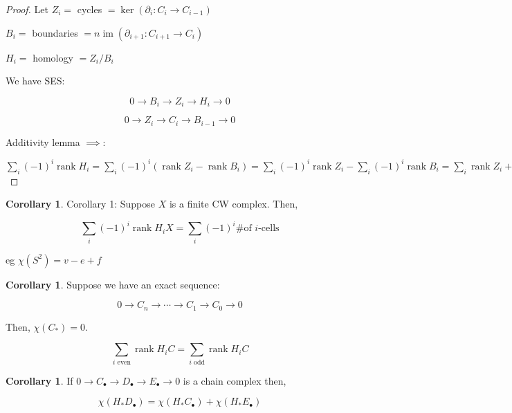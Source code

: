 \documentclass{article}
\theoremstyle{definition}
\newtheorem{corollary}[theorem]{Corollary}
\begin{document}
    \begin{proof}
        Let \(Z_i =\) cycles \(= \ker (\partial_i: C_i \to C_{i-1})\) 

        \(B_i =\) boundaries \(=n \operatorname{im} (\partial_{i+1}: C_{i+1} \to C_i)\) 

        \(H_i =\) homology \(= Z_i / B_i\) 

        We have SES:

        \[
            0 \to B_i \to Z_i \to H_i \to 0
        \]
        
        \[
            0 \to Z_i \to C_i \to B_{i-1} \to 0
        \]

        Additivity lemma \(\implies\):

        \(\sum_{i} (-1)^i \operatorname{rank} H_i = \sum_{i} (-1)^i (\operatorname{rank} Z_i - \operatorname{rank} B_i) = \sum_{i} (-1)^i \operatorname{rank} Z_i - \sum_{i} (-1)^i \operatorname{rank} B_i = \sum_{i} \operatorname{rank} Z_i + \sum_{i} (-1)^i \operatorname{rank} B_{i-1} = \sum_{i} (-1)^i \operatorname{rank} C_i\) 
    \end{proof}


    \begin{corollary}
        Corollary 1: Suppose \(X\) is a finite CW complex. Then,

        \[
            \sum_{i} (-1)^i \operatorname{rank} H_i X = \sum_{i} (-1)^i \text{\# of \(i\)-cells} 
        \]

        eg \(\chi(S^2) = v-e+f\)
    \end{corollary}

    \begin{corollary}
        Suppose we have an exact sequence:

        \[
            0 \to C_n \to \cdots \to C_1 \to C_0 \to 0
        \]

        Then, \(\chi(C_{\ast}) = 0\).

        \[
            \sum_{i \text{ even}} \operatorname{rank} H_i C = \sum_{i \text{ odd}} \operatorname{rank} H_i C  
        \]
    \end{corollary}

    \begin{corollary}
        If \(0 \to C_\bullet \to D_\bullet \to E_\bullet \to 0\) is a chain complex then,

        \[
            \chi(H_{\ast} D_\bullet) = \chi(H_{\ast} C_\bullet) + \chi(H_{\ast} E_\bullet)
        \]
    \end{corollary}
\end{document}

